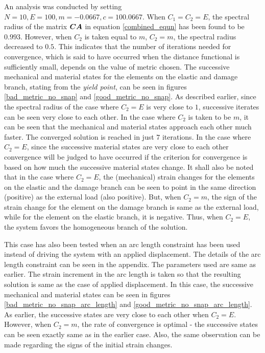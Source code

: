 \documentclass[11pt]{elsarticle}
\begin{document}
An analysis was conducted by setting $N=10, E=100, m=-0.0667, c=100.0667$. When $C_1=C_2=E$, the spectral radius of the matrix $\mbox{\boldmath $C$} \mbox{\boldmath $A$} $ in equation \ref{combined_equn} has been found to be $0.993$. However, when $C_2$ is taken equal to $m$, $C_2=m$, the spectral radius decreased to $0.5$. This indicates that the number of iterations needed for convergence, which is said to have occurred when the distance functional is sufficiently small, depends on the value of metric chosen. The successive mechanical and material states for the elements on the elastic and damage branch, stating from the \textit{yield point}, can be seen in figures \ref{bad_metric_no_snap} and \ref{good_metric_no_snap}. As described earlier, since the spectral radius of the case where $C_2=E$ is very close to $1$, successive iterates can be seen very close to each other. In the case where $C_2$ is taken to be $m$, it can be seen that the mechanical and material states approach each other much faster. The converged solution is reached in just $7$ iterations. In the case where $C_2=E$, since the successive material states are very close to each other convergence will be judged to have occurred if the criterion for convergence is based on how much the successive material states change. It shall also be noted that in the case where $C_2=E$, the (mechanical) strain changes for the elements on the elastic and the damage branch can be seen to point in the same direction (positive) as the external load (also positive). But, when $C_2=m$, the sign of the strain change for the element on the damage branch is same as the external load, while for the element on the elastic branch, it is negative. Thus, when $C_2=E$, the system favors the homogeneous branch of the solution.

This case has also been tested when an arc length constraint has been used instead of driving the system with an applied displacement. The details of the arc length constraint can be seen in the appendix. The parameters used are same as earlier. The strain increment in the arc length is taken so that the resulting solution is same as the case of applied displacement. In this case, the successive mechanical and material states can be seen in figures \ref{bad_metric_no_snap_arc_length} and \ref{good_metric_no_snap_arc_length}. As earlier, the successive states are very close to each other when $C_2=E$. However, when $C_2=m$, the rate of convergence is optimal - the successive states can be seen exactly same as in the earlier case. Also, the same observation can be made regarding the signs of the initial strain changes.
\end{document}
